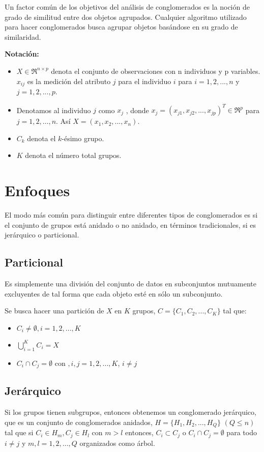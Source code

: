 Un factor común de los objetivos del análisis de conglomerados es la noción de grado de similitud entre dos objetos agrupados. Cualquier algoritmo utilizado para hacer conglomerados busca agrupar objetos basándose en su grado de similaridad.


\textbf{Notación:}
\begin{itemize}
\item $X \in \Re^{n \times p}$ denota el conjunto de observaciones con n individuos y p variables. $x_{ij}$ es la medición del atributo $j$ para el individuo $i$ para $i=1,2,...,n$ y $j=1,2,...,p$.
\item Denotamos al individuo $j$ como $x_{j}$ , donde $x_{j} = (x_{j1},x_{j2},...,x_{jp})^T \in \Re^p$ para $j=1,2,\dots,n$. Así $X=(x_{1},x_{2},...,x_{n})$.
\item $C_{k}$ denota el $k$-ésimo grupo.
\item $K$ denota el número total grupos.
\end{itemize}


\section{Enfoques}
El modo más común para distinguir entre diferentes tipos de conglomerados es si el conjunto de grupos está anidado o no anidado, en términos tradicionales, si es jerárquico o particional.

\subsection{Particional}
Es simplemente una división del conjunto de datos en subconjuntos mutuamente excluyentes de tal forma que cada objeto esté en sólo un subconjunto.

Se busca hacer una partición de $X$ en $K$ grupos, $C = \{C_{1},C_{2},...,C_{K}\}$ tal que:
	\begin{itemize}
	\item $C_{i} \neq \emptyset,i=1,2,...,K $
	\item $\displaystyle \bigcup_{i=1}^{K} C_{i} = X $
	\item $C_{i} \cap C_{j} = \emptyset $ con $, i,j=1,2,...,K $, $i \neq j$ 
	\end{itemize}


\subsection{Jerárquico}
Si los grupos tienen subgrupos, entonces obtenemos un conglomerado jerárquico, que es un conjunto de conglomerados anidados, $H = \{H_{1},H_{2},...,H_{Q}\}$ $(Q \leq n )$ tal que si $C_{i} \in H_{m},C_{j} \in H_{l}$ con $m>l$ entonces, $C_{i} \subset C_{j}$ o $C_{i} \cap C_{j} = \emptyset$ para todo $i \neq j$ y $m,l=1,2,...,Q$ organizados como árbol. 

